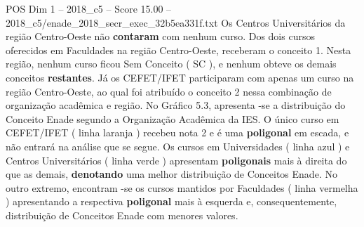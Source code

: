 \begin{textsample}{POS Dim 1 – 2018\_c5 – Score 15.00 – 2018\_c5/enade\_2018\_secr\_exec\_32b5ea331f.txt}
Os Centros Universitários da região Centro-Oeste não \textbf{contaram} com nenhum curso.
Dos dois cursos oferecidos em Faculdades na região Centro-Oeste, receberam o conceito 1.
Nesta região, nenhum curso ficou Sem Conceito ( SC ), e nenhum obteve os demais conceitos \textbf{restantes}.
Já os CEFET/IFET participaram com apenas um curso na região Centro-Oeste, ao qual foi atribuído o conceito 2 nessa combinação de organização acadêmica e região.
No Gráfico 5.3, apresenta -se a distribuição do Conceito Enade segundo a Organização Acadêmica da IES.
O único curso em CEFET/IFET ( linha laranja ) recebeu nota 2 e é uma \textbf{poligonal} em escada, e não entrará na análise que se segue.
Os cursos em Universidades ( linha azul ) e Centros Universitários ( linha verde ) apresentam \textbf{poligonais} mais à direita do que as demais, \textbf{denotando} uma melhor distribuição de Conceitos Enade.
No outro extremo, encontram -se os cursos mantidos por Faculdades ( linha vermelha ) apresentando a respectiva \textbf{poligonal} mais à esquerda e, consequentemente, distribuição de Conceitos Enade com menores valores.

\end{textsample}
